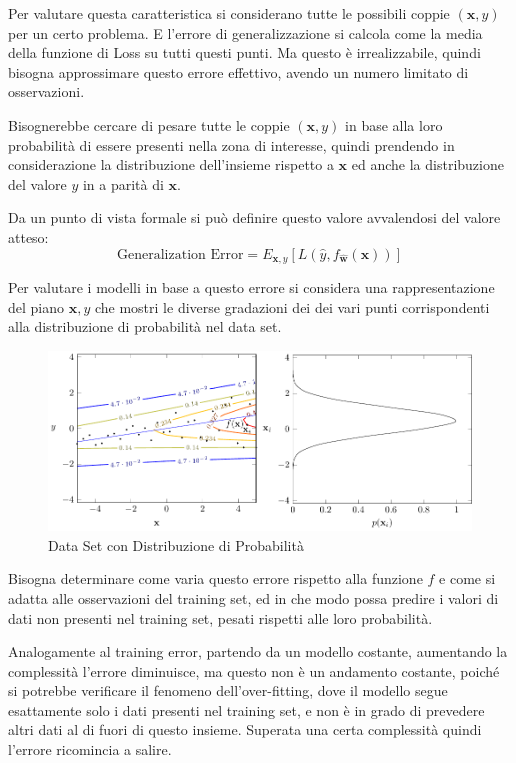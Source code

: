 \documentclass{article}
\numberwithin{equation}{subsection}
\newcommand{\vect}[1]{\boldsymbol{\mathbf{#1}}}
\begin{document}
Per valutare questa caratteristica si considerano tutte le possibili coppie $(\vect{x},y)$ 
per un certo problema. E l'errore di generalizzazione si calcola come la media della funzione di Loss su tutti questi punti. Ma questo è irrealizzabile, quindi bisogna approssimare questo errore effettivo, avendo un numero limitato di osservazioni. 

Bisognerebbe cercare di pesare tutte le coppie $(\vect{x}, y)$ in base alla loro probabilità di essere presenti nella zona di interesse, quindi prendendo in considerazione la 
distribuzione dell'insieme rispetto a $\vect{x}$ ed anche la distribuzione del valore $y$ in a parità di $\vect{x}$. 

Da un punto di vista formale si può definire questo valore avvalendosi del valore atteso:
\begin{equation}
    \text{Generalization Error}=E_{\vect{x},y}[L(\hat{y}, f_{\vect{\hat{w}}}(\vect{x}))] 
\end{equation}

Per valutare i modelli in base a questo errore si considera una rappresentazione 
del piano $\vect{x},y$ che mostri le diverse gradazioni dei dei vari punti corrispondenti 
alla distribuzione di probabilità nel data set. 

\begin{figure}[H]%
    \centering%
    \includegraphics[scale=0.65]{generalization_error.pdf}%
    \caption{Data Set con Distribuzione di Probabilità}%
\end{figure}

Bisogna determinare come varia questo errore rispetto alla funzione $f$ e come si 
adatta alle osservazioni del training set, ed in che modo possa predire i valori di dati 
non presenti nel training set, pesati rispetti alle loro probabilità. 

Analogamente al training error, partendo da un modello costante, aumentando la complessità 
l'errore diminuisce, ma questo non è un andamento costante, poiché si potrebbe 
verificare il fenomeno dell'over-fitting, dove il modello segue esattamente solo i dati presenti nel training set, e non è in grado di prevedere altri dati al di fuori di questo insieme. Superata una certa complessità quindi l'errore ricomincia a salire. 
\end{document}

